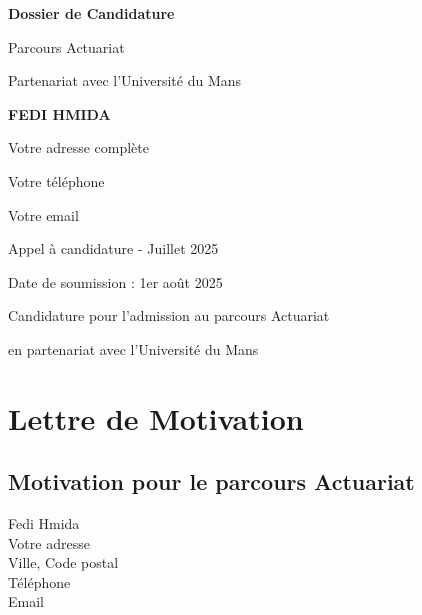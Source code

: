 \documentclass[12pt,a4paper]{article}
\begin{document}
\begin{titlepage}
    \centering
    \vspace*{2cm}
    
    {\Huge\bfseries Dossier de Candidature\par}
    \vspace{1cm}
    {\Large Parcours Actuariat\par}
    \vspace{0.5cm}
    {\large Partenariat avec l'Université du Mans\par}
    \vspace{2cm}
    
    {\LARGE\bfseries FEDI HMIDA\par}
    \vspace{1cm}
    {\large Votre adresse complète\par}
    {\large Votre téléphone\par}
    {\large Votre email\par}
    \vspace{2cm}
    
    {\large Appel à candidature - Juillet 2025\par}
    \vspace{1cm}
    {\large Date de soumission : 1er août 2025\par}
    
    \vfill
    
    {\large Candidature pour l'admission au parcours Actuariat\par}
    {\large en partenariat avec l'Université du Mans\par}
\end{titlepage}

\tableofcontents
\newpage

\section{Lettre de Motivation}
\label{sec:lettre}

\subsection{Motivation pour le parcours Actuariat}

\noindent
Fedi Hmida\\
Votre adresse\\
Ville, Code postal\\
Téléphone\\
Email\\
\end{document}
